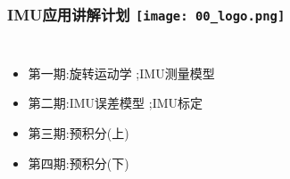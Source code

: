 



\begin{frame}
  \frametitle{IMU应用讲解计划 \hfill \texttt{[image: 00\_logo.png]}}
  \begin{columns}
    
    \begin{itemize}
      \item {\color{red}第一期:旋转运动学 ;\quad IMU测量模型}
      
      \item 第二期:IMU误差模型 ;\quad IMU标定

      \item 第三期:预积分(上)
      
      \item 第四期:预积分(下)


    \end{itemize}
    

  
  \end{columns}
  \end{frame}   